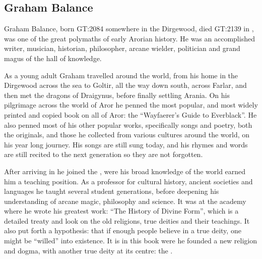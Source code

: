 \ifimages
\clearpage
{}
\clearpage
\fi

\subsection{Graham Balance}
\label{sec:Graham Balance}

Graham Balance, born GT:2084 somewhere in the Dirgewood, died GT:2139 in
, was one of the great polymaths of early Arorian
history. He was an accomplished writer, musician, historian, philosopher,
arcane wielder, politician and grand magus of the hall of knowledge.

As a young adult Graham travelled around the world, from his home in the
Dirgewood across the sea to Goltir, all the way down south, across Farlar, and
then met the dragons of Draigynus, before finally settling Arania. On his
pilgrimage across the world of Aror he penned the most popular, and most
widely printed and copied book on all of Aror: the ``Wayfaerer's Guide to
Everblack''. He also penned most of his other popular works, specifically songs
and poetry, both the originals, and those he collected from various cultures
around the world, on his year long journey. His songs are still sung today,
and his rhymes and words are still recited to the next generation so they are
not forgotten.

After arriving in  he joined the , were his broad knowledge of the world earned him a teaching
position. As a professor for cultural history, ancient societies and languages
he taught several student generations, before deepening his understanding of
arcane magic, philosophy and science. It was at the academy where he wrote his
greatest work: ``The History of Divine Form'', which is a detailed treaty and
look on the old religions, true deities and their teachings. It also put forth
a hypothesis: that if enough people believe in a true deity, one might be
``willed'' into existence. It is in this book were he founded a new religion
and dogma, with another true deity at its centre: the .

